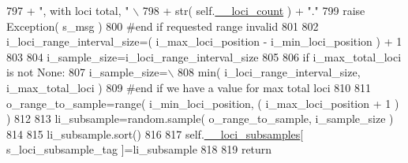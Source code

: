 \begin{DoxyCode}
797                         + \textcolor{stringliteral}{", with loci total, "} \(\backslash\)
798                         + str( self.\hyperlink{classnegui_1_1genepopfilemanager_1_1GenepopFileManager_a89b855b2f9aa7f7570f9379edb17418e}{\_\_loci\_count} ) + \textcolor{stringliteral}{"."}
799             \textcolor{keywordflow}{raise} Exception( s\_msg )
800         \textcolor{comment}{#end if requested range invalid}
801 
802         i\_loci\_range\_interval\_size=( i\_max\_loci\_position - i\_min\_loci\_position ) + 1
803 
804         i\_sample\_size=i\_loci\_range\_interval\_size 
805         
806         \textcolor{keywordflow}{if} i\_max\_total\_loci \textcolor{keywordflow}{is} \textcolor{keywordflow}{not} \textcolor{keywordtype}{None}:
807             i\_sample\_size=\(\backslash\)
808                     min( i\_loci\_range\_interval\_size, i\_max\_total\_loci ) 
809         \textcolor{comment}{#end if we have a value for max total loci }
810 
811         o\_range\_to\_sample=range( i\_min\_loci\_position, ( i\_max\_loci\_position + 1 ) )
812 
813         li\_subsample=random.sample( o\_range\_to\_sample, i\_sample\_size )
814 
815         li\_subsample.sort()
816 
817         self.\hyperlink{classnegui_1_1genepopfilemanager_1_1GenepopFileManager_af867ba70728e8a3aaf0097ddd6399e28}{\_\_loci\_subsamples}[ s\_loci\_subsample\_tag ]=li\_subsample
818 
819         \textcolor{keywordflow}{return}
\end{DoxyCode}
